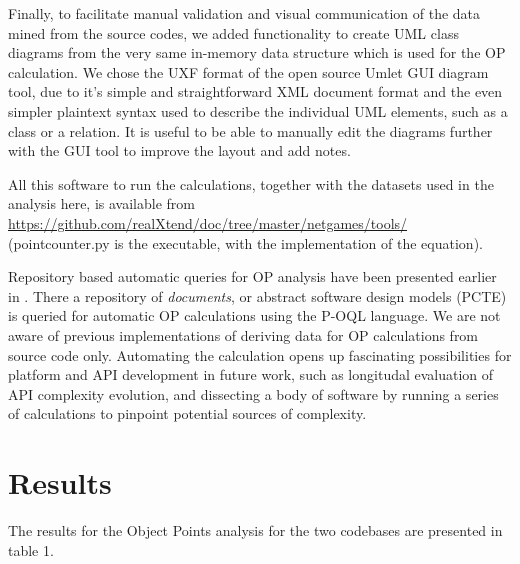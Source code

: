 \documentclass[conference]{IEEEtran}
\begin{document}
Finally, to facilitate manual validation and visual communication of
the data mined from the source codes, we added functionality to create
UML class diagrams from the very same in-memory data structure which
is used for the OP calculation. We chose the UXF format of the open
source Umlet GUI diagram tool, due to it's simple and straightforward
XML document format and the even simpler plaintext syntax used to
describe the individual UML elements, such as a class or a
relation. It is useful to be able to manually edit the diagrams
further with the GUI tool to improve the layout and add notes.

All this software to run the calculations, together with the datasets
used in the analysis here, is available from
\url{https://github.com/realXtend/doc/tree/master/netgames/tools/}
(pointcounter.py is the executable, with the implementation of the
equation).

Repository based automatic queries for OP analysis have been presented
earlier in \cite{henrich97repositorybased}. There a repository of
\emph{documents}, or abstract software design models (PCTE) is queried for
automatic OP calculations using the P-OQL language. We are not aware
of previous implementations of deriving data for OP calculations from
source code only. Automating the calculation opens up fascinating
possibilities for platform and API development in future work, such as
longitudal evaluation of API complexity evolution, and dissecting a
body of software by running a series of calculations to pinpoint
potential sources of complexity.


\section{Results%
  \label{results}%
}

The results for the Object Points analysis for the two codebases are
presented in table 1.
\end{document}
